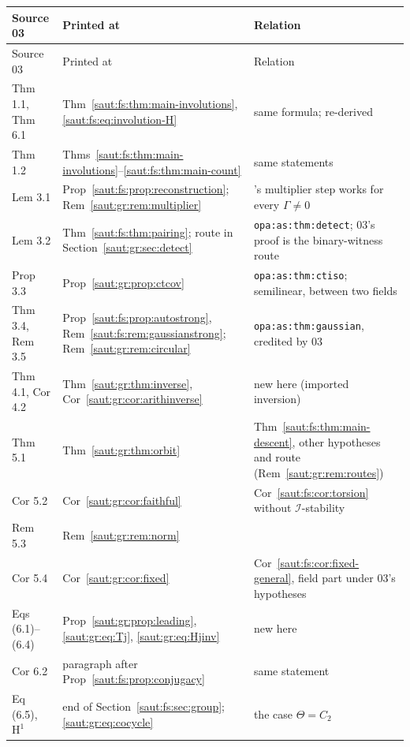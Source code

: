 \documentclass[11pt]{article}
\theoremstyle{definition}
\theoremstyle{remark}
\newcommand{\lbl}[1]{\nolinkurl{#1}}%
\newcommand{\Ineg}{\mathcal I}
\numberwithin{equation}{section}
\begin{document}
\begin{center}
\small
\begin{longtable}{@{}>{\RaggedRight\arraybackslash}p{}>{\RaggedRight\arraybackslash}p{}>{\RaggedRight\arraybackslash}p{}@{}}
\toprule
Source 03 & Printed at & Relation\\
\midrule
\endfirsthead
\toprule
Source 03 & Printed at & Relation\\
\midrule
\endhead
Thm 1.1, Thm 6.1 & Thm~\ref{saut:fs:thm:main-involutions}, \eqref{saut:fs:eq:involution-H} & same formula; re-derived\\
Thm 1.2 & Thms~\ref{saut:fs:thm:main-involutions}--\ref{saut:fs:thm:main-count} & same statements\\
Lem 3.1 & Prop~\ref{saut:fs:prop:reconstruction}; Rem~\ref{saut:gr:rem:multiplier} & 03's multiplier step works for every $\Gamma\ne0$\\
Lem 3.2 & Thm~\ref{saut:fs:thm:pairing}; route in Section~\ref{saut:gr:sec:detect} & \lbl{opa:as:thm:detect}; 03's proof is the binary-witness route\\
Prop 3.3 & Prop~\ref{saut:gr:prop:ctcov} & \lbl{opa:as:thm:ctiso}; semilinear, between two fields\\
Thm 3.4, Rem 3.5 & Prop~\ref{saut:fs:prop:autostrong}, Rem~\ref{saut:fs:rem:gaussianstrong}; Rem~\ref{saut:gr:rem:circular} & \lbl{opa:as:thm:gaussian}, credited by 03\\
Thm 4.1, Cor 4.2 & Thm~\ref{saut:gr:thm:inverse}, Cor~\ref{saut:gr:cor:arithinverse} & new here (imported inversion)\\
Thm 5.1 & Thm~\ref{saut:gr:thm:orbit} & Thm~\ref{saut:fs:thm:main-descent}, other hypotheses and route (Rem~\ref{saut:gr:rem:routes})\\
Cor 5.2 & Cor~\ref{saut:gr:cor:faithful} & Cor~\ref{saut:fs:cor:torsion} without $\Ineg$-stability\\
Rem 5.3 & Rem~\ref{saut:gr:rem:norm} & \\
Cor 5.4 & Cor~\ref{saut:gr:cor:fixed} & Cor~\ref{saut:fs:cor:fixed-general}, field part under 03's hypotheses\\
Eqs (6.1)--(6.4) & Prop~\ref{saut:gr:prop:leading}, \eqref{saut:gr:eq:Tj}, \eqref{saut:gr:eq:Hjinv} & new here\\
Cor 6.2 & paragraph after Prop~\ref{saut:fs:prop:conjugacy} & same statement\\
Eq (6.5), $\mathrm H^1$ & end of Section~\ref{saut:fs:sec:group}; \eqref{saut:gr:eq:cocycle} & the case $\Theta=C_2$\\

\end{longtable}
\end{center}
\end{document}
